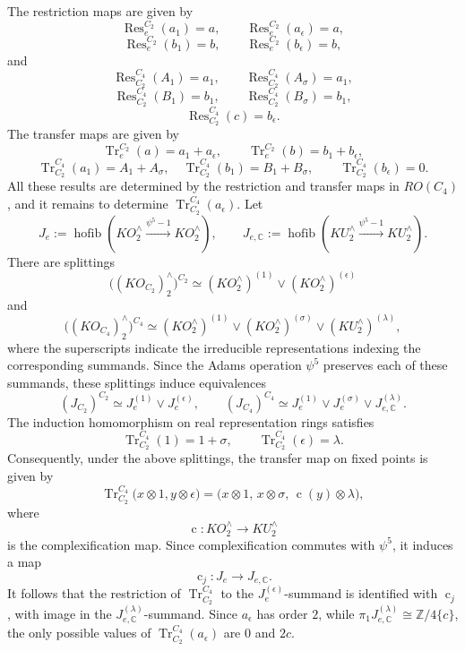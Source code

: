 \documentclass{amsart}
\theoremstyle{plain}
\theoremstyle{definition}
\theoremstyle{remark}
\begin{document}
The restriction maps are given by 
\[
\operatorname{Res}_e^{C_2}(a_1)=a, \qquad \operatorname{Res}_e^{C_2}(a_\epsilon)=a,
\]
\[
\operatorname{Res}_e^{C_2}(b_1)=b, \qquad \operatorname{Res}_e^{C_2}(b_\epsilon)=b,
\]
and
\[
\operatorname{Res}_{C_2}^{C_4}(A_1)=a_1, \qquad \operatorname{Res}_{C_2}^{C_4}(A_\sigma)=a_1,
\]
\[
\operatorname{Res}_{C_2}^{C_4}(B_1)=b_1, \qquad \operatorname{Res}_{C_2}^{C_4}(B_\sigma)=b_1,
\]
\[
\operatorname{Res}_{C_2}^{C_4}(c)=b_\epsilon.
\]
The transfer maps are given by 
\[
\operatorname{Tr}_e^{C_2}(a)=a_1+a_\epsilon, \qquad \operatorname{Tr}_e^{C_2}(b)=b_1+b_\epsilon,
\]
\[
\operatorname{Tr}_{C_2}^{C_4}(a_1)=A_1+A_\sigma, \quad \operatorname{Tr}_{C_2}^{C_4}(b_1)=B_1+B_\sigma, \qquad \operatorname{Tr}_{C_2}^{C_4}(b_\epsilon)=0.
\]
All these results are determined by the restriction and transfer maps in $RO(C_4)$, and it remains to determine $\operatorname{Tr}_{C_2}^{C_4}(a_\epsilon)$. Let
\[
J_e:=\operatorname{hofib}\left(
KO_2^\wedge\xrightarrow{\psi^5-1}KO_2^\wedge
\right),
\qquad
J_{e,\mathbb C}:=\operatorname{hofib}\left(
KU_2^\wedge\xrightarrow{\psi^5-1}KU_2^\wedge
\right).
\]
There are splittings
\[
\bigl((KO_{C_2})_2^\wedge\bigr)^{C_2}
\simeq
(KO_2^\wedge)^{(1)}\vee (KO_2^\wedge)^{(\epsilon)}
\]
and
\[
\bigl((KO_{C_4})_2^\wedge\bigr)^{C_4}
\simeq
(KO_2^\wedge)^{(1)}
\vee
(KO_2^\wedge)^{(\sigma)}
\vee
(KU_2^\wedge)^{(\lambda)},
\]
where the superscripts indicate the irreducible representations indexing
the corresponding summands. Since the Adams operation \(\psi^5\)
preserves each of these summands, these splittings induce equivalences
\[
(J_{C_2})^{C_2}
\simeq
J_e^{(1)}\vee J_e^{(\epsilon)}, \qquad 
(J_{C_4})^{C_4}
\simeq
J_e^{(1)}\vee J_e^{(\sigma)}\vee J_{e,\mathbb C}^{(\lambda)}.
\]
The induction homomorphism on real representation rings satisfies
\[
\operatorname{Tr}_{C_2}^{C_4}(1)=1+\sigma,
\qquad
\operatorname{Tr}_{C_2}^{C_4}(\epsilon)=\lambda.
\]
Consequently, under the above splittings, the transfer map on fixed
points is given by
\[
\operatorname{Tr}_{C_2}^{C_4}
\bigl(x\otimes 1,y\otimes\epsilon\bigr)
=
\bigl(
x\otimes 1,\,
x\otimes\sigma,\,
\operatorname{c}(y)\otimes\lambda
\bigr),
\]
where
\[
\operatorname{c}\colon KO_2^\wedge\longrightarrow KU_2^\wedge
\]
is the complexification map. Since complexification commutes with
\(\psi^5\), it induces a map
\[
\operatorname{c}_j\colon J_e\longrightarrow J_{e,\mathbb C}.
\]
It follows that the restriction of
\(\operatorname{Tr}_{C_2}^{C_4}\) to the \(J_e^{(\epsilon)}\)-summand is
identified with \(\operatorname{c}_j\), with image in the
\(J_{e,\mathbb C}^{(\lambda)}\)-summand. Since \(a_\epsilon\) has order
\(2\), while $\pi_1J_{e,\mathbb C}^{(\lambda)} \cong \mathbb Z/4\{c\}$,
the only possible values of $\operatorname{Tr}_{C_2}^{C_4}(a_\epsilon)$ are $0$ and $2c$.
\end{document}
